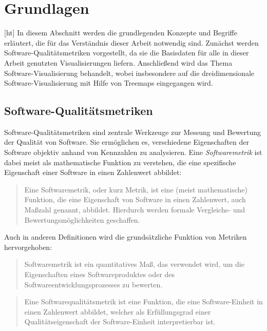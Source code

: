 \section{Grundlagen}[ht] \label{sec:Grundlagen}
In diesem Abschnitt werden die grundlegenden Konzepte und Begriffe erläutert, die für das Verständnis dieser Arbeit notwendig sind. Zunächst werden Software-Qualitätsmetriken vorgestellt, da sie die Basisdaten für alle in dieser Arbeit genutzten Visualisierungen liefern. Anschließend wird das Thema Software-Visualisierung behandelt, wobei insbesondere auf die dreidimensionale Software-Visualisierung mit Hilfe von Treemaps eingegangen wird.

\subsection{Software-Qualitätsmetriken} \label{sec:SoftwareQualitaetsmetriken}

Software-Qualitätsmetriken sind zentrale Werkzeuge zur Messung und Bewertung der Qualität von Software. Sie ermöglichen es, verschiedene Eigenschaften der Software objektiv anhand von Kennzahlen zu analysieren. Eine \textit{Softwaremetrik} ist dabei meist als mathematische Funktion zu verstehen, die eine spezifische Eigenschaft einer Software in einen Zahlenwert abbildet:

\begin{quote}
    Eine Softwaremetrik, oder kurz Metrik, ist eine (meist mathematische) Funktion, die eine Eigenschaft von Software in einen Zahlenwert, auch Maßzahl genannt, abbildet. Hierdurch werden formale Vergleichs- und Bewertungsmöglichkeiten geschaffen.\cite{wikipedia_softwaremetrik}
\end{quote}

Auch in anderen Definitionen wird die grundsätzliche Funktion von Metriken hervorgehoben:

\begin{quote}
    Softwaremetrik ist ein quantitatives Maß, das verwendet wird, um die Eigenschaften eines Softwareproduktes oder des Softwareentwicklungsprozesses zu bewerten.\cite{softwaremetriken_2019}
\end{quote}

\begin{quote}
    Eine Softwarequalitätsmetrik ist eine Funktion, die eine Software-Einheit in einen Zahlenwert abbildet, welcher als Erfüllungsgrad einer Qualitätseigenschaft der Software-Einheit interpretierbar ist.\cite{def_qual_metric}
\end{quote}

